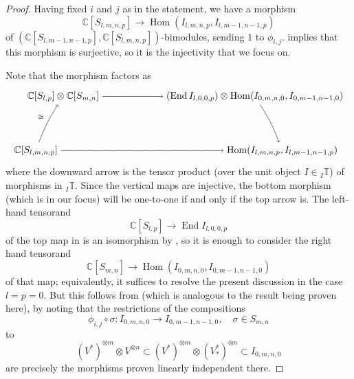 \documentclass[11pt]{article}
\theoremstyle{plain}
\theoremstyle{nonumberplain}
\theoremstyle{plain}
\numberwithin{equation}{section}
\theoremstyle{nonumberplain}
\newtheorem{proof}{Proof}
\newcommand\bC{{\mathbb C}}
\newcommand\bT{{\mathbb T}}
\newcommand\1{{\bf 1}}
\DeclareMathOperator{\End}{\mathrm{End}}
\DeclareMathOperator{\Hom}{\mathrm{Hom}}
\begin{document}
\begin{proof}  
  {} Having fixed $i$ and $j$ as in the statement, we have a morphism
  \begin{equation}\label{eq:mnm1n1}
    \bC [S_{l,m,n,p}]\to \Hom(I_{l,m,n,p},I_{l,m-1,n-1,p})
  \end{equation}
  of $(\bC[S_{l,m-1,n-1,p}], \bC[S_{l,m,n,p}])$-bimodules, sending $1$ to $\phi_{i,j}$.  implies that this morphism is surjective, so it is the injectivity that we focus on.   

  Note that the morphism  factors as
  \begin{equation}\label{eq:largediag}
    \begin{tikzpicture}[auto,baseline=(current  bounding  box.center)]
      \path[anchor=base] 
      (0,0) node (l) {$\bC [S_{l,m,n,p}]$}
      +(1,2) node (ul) {$\bC [S_{l,p}]\otimes \bC [S_{m,n}]$}
      +(8,2) node (ur) {$(\End I_{l,0,0,p})\otimes \Hom(I_{0,m,n,0},I_{0,m-1,n-1,0})$}
      +(9,0) node (r) {$\Hom(I_{l,m,n,p},I_{l,m-1,n-1,p})$}
      ;
      \draw[->] (l) to[bend left=6] node[pos=.5,auto] {$\scriptstyle \cong$} (ul);
      \draw[->] (ul) to[bend left=0] node[pos=.5,auto] {$\scriptstyle $} (ur);
      \draw[->] (ur) to[bend left=6] node[pos=.5,auto,swap] {$\scriptstyle $} (r);
      \draw[->] (l) to[bend right=0] node[pos=.5,auto,swap] {$\scriptstyle $} (r);
    \end{tikzpicture}
  \end{equation}
  where the downward arrow is the tensor product (over the unit object $I\in {}_I\bT$) of morphisms in ${}_I\bT$. Since the vertical maps are injective, the bottom morphism (which is in our focus) will be one-to-one if and only if the top arrow is. The left-hand tensorand
  \begin{equation*}
    \bC [S_{l,p}]\to \End I_{l,0,0,p}
  \end{equation*}
  of the top map in  is an isomorphism by , so it is enough to consider the right hand tensorand
  \begin{equation*}
    \bC [S_{m,n}]\to \Hom(I_{0,m,n,0},I_{0,m-1,n-1,0})
  \end{equation*}
  of that map; equivalently, it suffices to resolve the present discussion in the case $l=p=0$. But this follows from \cite[Lemma 3.25 (a)]{us0} (which is analogous to the result being proven here), by noting that the restrictions of the compositions
  \begin{equation*}
    \phi_{i,j}\circ \sigma: I_{0,m,n,0}\to I_{0,m-1,n-1,0},\quad \sigma\in S_{m,n}
  \end{equation*}
  to
  \begin{equation*}
    (V^*)^{\otimes m}\otimes V^{\otimes n}\subset (V^*)^{\otimes m}\otimes (V_*^*)^{\otimes n}\subset I_{0,m,n,0}
  \end{equation*}
  are precisely the morphisms proven linearly independent there. 


\end{proof}
\end{document}
